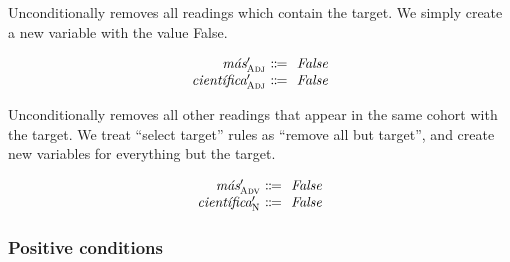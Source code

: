  Unconditionally removes all readings which contain the target. We simply create a new variable with the value False.

\begin{equation}
\centering
%
\begin{array}{r @{~\eqdef~} l}
    \newVar \mas{}'_\adj         & \text{ \em False} \\
    \newVar \cientifica{}'_\adj  & \text{ \em False} \\
  \end{array}
\end{equation}

 Unconditionally removes all other readings that appear in the same cohort with the target. 
We treat ``{\sc select} target'' rules as ``{\sc remove} all but target'', and create new variables for everything but the target. 

\begin{equation}
\begin{array}{r @{~\eqdef~} l}
    \newVar \mas{}'_\adv      & \text{ \em False} \\
    \newVar \cientifica{}'_\n & \text{ \em False} \\
\end{array}
\label{eq:slAdjOrdered}
\end{equation}



\subsubsection{Positive conditions}

\def\invConds{\text{invalid condition}}
\def\onlyTrgLeft{\text{only target left}}

